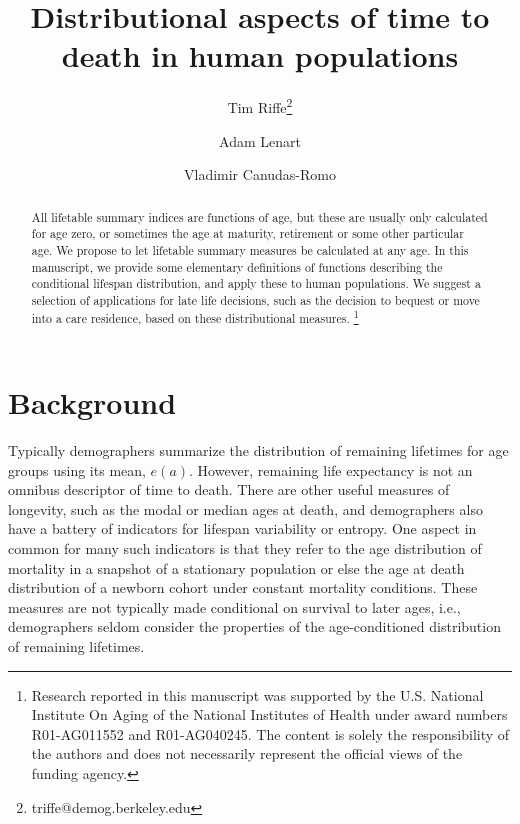 \documentclass{article}
\newcommand\ackn[1]{%
  \begingroup
  \renewcommand\thefootnote{}\footnote{#1}%
  \addtocounter{footnote}{-1}%
  \endgroup
}
\begin{document}
\title{Distributional aspects of time to death in human populations}

\author[1]{Tim Riffe\thanks{triffe@demog.berkeley.edu}}
\author[2,3]{Adam Lenart}
\author[2,3]{Vladimir Canudas-Romo}

\maketitle

\begin{abstract}
All lifetable summary indices are functions of age, but these are usually
only calculated for age zero, or sometimes the age at maturity, retirement or
some other particular age. We propose to let lifetable summary measures be
calculated at any age. In this manuscript, we provide some elementary definitions of functions describing the
conditional lifespan distribution, and apply these to human populations.
We suggest a selection of applications for late life
decisions, such as the decision to bequest or move into a care residence, based
on these distributional measures.\ackn{Research reported in this manuscript
was supported by the U.S.
National Institute On Aging of the National Institutes of Health under award
numbers R01-AG011552 and R01-AG040245. The content is solely the responsibility of the authors and does not necessarily represent the official views of the funding
agency.}
\end{abstract}

 \linespread{1.3}
\section*{Background}

Typically demographers summarize the distribution of remaining
lifetimes for age groups using its mean, $e(a)$. However, remaining life
expectancy is not an omnibus descriptor of time to death. There are other
useful measures of longevity, such as the modal or median ages at death, and demographers also have a battery of
indicators for lifespan variability or entropy. One aspect in common for many
such indicators is that they refer to the age distribution of mortality in a snapshot of a stationary population or else the age at death distribution of a newborn cohort under constant mortality
conditions. These measures are not typically made conditional on survival to
later ages, i.e., demographers seldom consider the properties of the
age-conditioned distribution of remaining lifetimes. 
\end{document}
